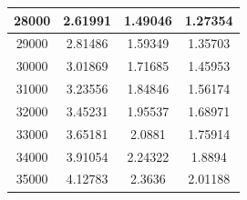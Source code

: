 \begin{center}
\begin{tabular}{| c | c | c | c |}
28000 & 2.61991 & 1.49046 & 1.27354 \\ \hline
29000 & 2.81486 & 1.59349 & 1.35703 \\ \hline
30000 & 3.01869 & 1.71685 & 1.45953 \\ \hline
31000 & 3.23556 & 1.84846 & 1.56174 \\ \hline
32000 & 3.45231 & 1.95537 & 1.68971 \\ \hline
33000 & 3.65181 & 2.0881 & 1.75914 \\ \hline
34000 & 3.91054 & 2.24322 & 1.8894 \\ \hline
35000 & 4.12783 & 2.3636 & 2.01188 \\ \hline
\hline
\end{tabular}
\end{center}
